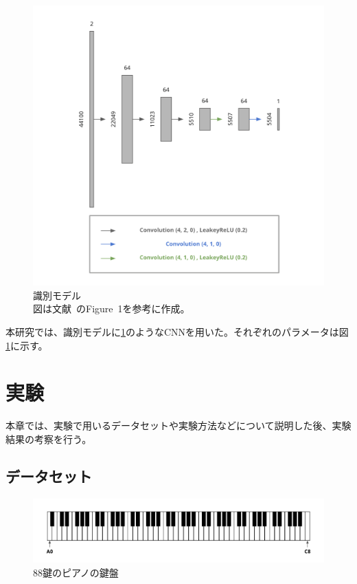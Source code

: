 \begin{figure}[b]
\begin{center}
\includegraphics[width=0.8\hsize]{figure/pr_discriminator.png}
\caption{識別モデル\\
図は文献~\cite{u-net}のFigure~1を参考に作成。}
\label{fig:pr_dis}
\end{center}
\end{figure}

本研究では、識別モデルに\ref{fig:pr_dis}のようなCNNを用いた。それぞれのパラメータは図\ref{fig:pr_dis}に示す。

\chapter{実験}

本章では、実験で用いるデータセットや実験方法などについて説明した後、実験結果の考察を行う。

\section{データセット}

\begin{figure}[t]
\begin{center}
\includegraphics[width=\hsize]{figure/piano.png}
\caption{88鍵のピアノの鍵盤}
\label{fig:piano}
\end{center}
\end{figure}

